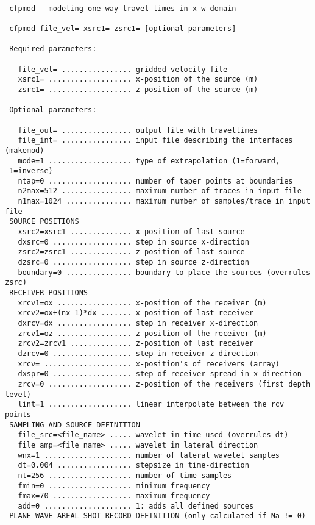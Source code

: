 {\footnotesize
\begin{verbatim}
  
 cfpmod - modeling one-way travel times in x-w domain
 
 cfpmod file_vel= xsrc1= zsrc1= [optional parameters]
  
 Required parameters:
 
   file_vel= ................ gridded velocity file
   xsrc1= ................... x-position of the source (m)
   zsrc1= ................... z-position of the source (m)
  
 Optional parameters:
  
   file_out= ................ output file with traveltimes
   file_int= ................ input file describing the interfaces (makemod)
   mode=1 ................... type of extrapolation (1=forward, -1=inverse)
   ntap=0 ................... number of taper points at boundaries
   n2max=512 ................ maximum number of traces in input file
   n1max=1024 ............... maximum number of samples/trace in input file
 SOURCE POSITIONS 
   xsrc2=xsrc1 .............. x-position of last source
   dxsrc=0 .................. step in source x-direction
   zsrc2=zsrc1 .............. z-position of last source
   dzsrc=0 .................. step in source z-direction
   boundary=0 ............... boundary to place the sources (overrules zsrc)
 RECEIVER POSITIONS 
   xrcv1=ox ................. x-position of the receiver (m)
   xrcv2=ox+(nx-1)*dx ....... x-position of last receiver
   dxrcv=dx ................. step in receiver x-direction
   zrcv1=oz ................. z-position of the receiver (m)
   zrcv2=zrcv1 .............. z-position of last receiver
   dzrcv=0 .................. step in receiver z-direction
   xrcv= .................... x-position's of receivers (array)
   dxspr=0 .................. step of receiver spread in x-direction
   zrcv=0 ................... z-position of the receivers (first depth level)
   lint=1 ................... linear interpolate between the rcv points
 SAMPLING AND SOURCE DEFINITION 
   file_src=<file_name> ..... wavelet in time used (overrules dt)
   file_amp=<file_name> ..... wavelet in lateral direction 
   wnx=1 .................... number of lateral wavelet samples
   dt=0.004 ................. stepsize in time-direction 
   nt=256 ................... number of time samples
   fmin=0 ................... minimum frequency 
   fmax=70 .................. maximum frequency
   add=0 .................... 1: adds all defined sources
 PLANE WAVE AREAL SHOT RECORD DEFINITION (only calculated if Na != 0)

\end{verbatim}}
